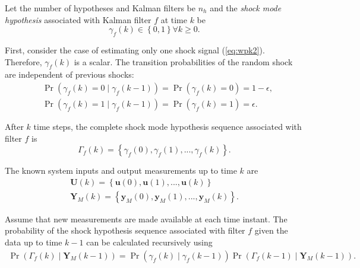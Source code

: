 Let the number of hypotheses and Kalman filters be $n_h$ and the \textit{shock mode hypothesis} associated with Kalman filter $f$ at time $k$ be
%
\begin{equation} \label{eq:gammak}
	\gamma_{f}(k) \in \left\{0, 1 \right\} \forall{k \ge 0}.
\end{equation}

First, consider the case of estimating only one shock signal (\ref{eq:wpk2}). Therefore, $\gamma_f(k)$ is a scalar. The transition probabilities of the random shock are independent of previous shocks:
%
\begin{equation} \label{eq:Pr_gammak_given_gammakm1}
	\begin{aligned}
		& \Pr\left(\gamma_{f}(k)=0 \mid \gamma_{f}(k-1)\right) = \Pr\left(\gamma_{f}(k)=0\right) = 1-\epsilon, \\
		& \Pr\left(\gamma_{f}(k)=1 \mid \gamma_{f}(k-1)\right) = \Pr\left(\gamma_{f}(k)=1\right) = \epsilon.
	\end{aligned}
\end{equation}

After $k$ time steps, the complete shock mode hypothesis sequence associated with filter $f$ is
\begin{equation} \label{eq:Gammak}
	\Gamma_f(k) = \left\{ \gamma_f(0), \gamma_f(1), ..., \gamma_f(k) \right\}.
\end{equation}
%

The known system inputs and output measurements up to time $k$ are
\begin{equation} \label{eq:Uk_Yk}
	\begin{aligned}
		\mathbf{U}(k) = \left\{ \mathbf{u}(0), \mathbf{u}(1), ..., \mathbf{u}(k) \right\} \\
		\mathbf{Y}_M(k) = \left\{ \mathbf{y}_M(0), \mathbf{y}_M(1), ..., \mathbf{y}_M(k) \right\}.
	\end{aligned}
\end{equation}

Assume that new measurements are made available at each time instant. The probability of the shock hypothesis sequence associated with filter $f$ given the data up to time $k-1$ can be calculated recursively using
\begin{multline} \label{eq:Pr_Gammak_given_Ykm1}
	\Pr(\Gamma_f(k) \mid \mathbf{Y}_M(k-1)) = 
	\Pr(\gamma_f(k) \mid \gamma_f(k-1)) \Pr(\Gamma_f(k-1) \mid \mathbf{Y}_M(k-1)).
\end{multline}

